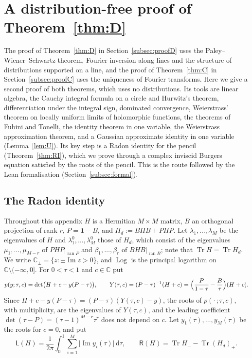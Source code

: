 \documentclass[11pt]{amsart}
\theoremstyle{definition}
\theoremstyle{remark}
\numberwithin{equation}{section}
\newcommand{\C}{\mathbb{C}}
\newcommand{\Tr}{\operatorname{Tr}}
\renewcommand{\Im}{\operatorname{Im}}
\newcommand{\one}{\mathbf{1}}
\newcommand{\dd}{\,\mathrm{d}}
\begin{document}
\section{A distribution-free proof of Theorem~\ref{thm:D}}\label{app:RI}

The proof of Theorem~\ref{thm:D} in Section~\ref{subsec:proofD} uses the Paley--Wiener--Schwartz theorem, Fourier
inversion along lines and the structure of distributions supported on a line, and the proof of Theorem~\ref{thm:C} in
Section~\ref{subsec:proofC} uses the uniqueness of Fourier transforms. Here we give a second proof of both theorems,
which uses no distributions. Its tools are linear algebra, the Cauchy integral formula on a circle and Hurwitz's theorem,
differentiation under the integral sign, dominated convergence, Weierstrass' theorem on locally uniform limits of
holomorphic functions, the theorems of Fubini and Tonelli, the identity theorem in one variable, the Weierstrass
approximation theorem, and a Gaussian approximate identity in one variable (Lemma~\ref{lem:U}). Its key step is a Radon
identity for the pencil (Theorem~\ref{thm:RI}), which we prove through
a complex inviscid Burgers equation satisfied by the roots of the pencil. This is the route followed by the Lean
formalisation (Section~\ref{subsec:formal}).

\subsection{The Radon identity}
Throughout this appendix $H$ is a Hermitian $M\times M$ matrix, $B$ an orthogonal projection of rank $r$, $P=\one-B$, and
$H_d:=BHB+PHP$. Let $\lambda_1,\dots,\lambda_M$ be the eigenvalues of $H$ and $\lambda^0_1,\dots,\lambda^0_M$ those of $H_d$,
which consist of the eigenvalues $\mu_1,\dots,\mu_{M-r}$ of $PHP|_{\operatorname{ran}P}$ and $\beta_1,\dots,\beta_r$ of
$BHB|_{\operatorname{ran}B}$; note that $\Tr H=\Tr H_d$. We write $\C_\pm=\{z:\pm\Im z>0\}$, and $\operatorname{Log}$ is the
principal logarithm on $\C\setminus(-\infty,0]$. For $0<\tau<1$ and $c\in\C$ put
\[
p(y;\tau,c)=\det\bigl(H+c-y(P-\tau)\bigr),\qquad Y(\tau,c)=(P-\tau)^{-1}(H+c)=\Bigl(\frac P{1-\tau}-\frac B\tau\Bigr)(H+c).
\]
Since $H+c-y(P-\tau)=(P-\tau)(Y(\tau,c)-y)$, the roots of $p(\cdot\,;\tau,c)$, with multiplicity, are the eigenvalues of
$Y(\tau,c)$, and the leading coefficient $\det(\tau-P)=(\tau-1)^{M-r}\tau^r$ does not depend on $c$. Let
$y_1(\tau),\dots,y_M(\tau)$ be the roots for $c=0$, and put
\[
\mathsf L(H)=\frac1{2\pi}\int_0^1\sum_{i=1}^M\bigl|\Im y_i(\tau)\bigr|\dd\tau,\qquad \mathsf R(H)=\Tr H_+-\Tr(H_d)_+ .
\]
\end{document}
